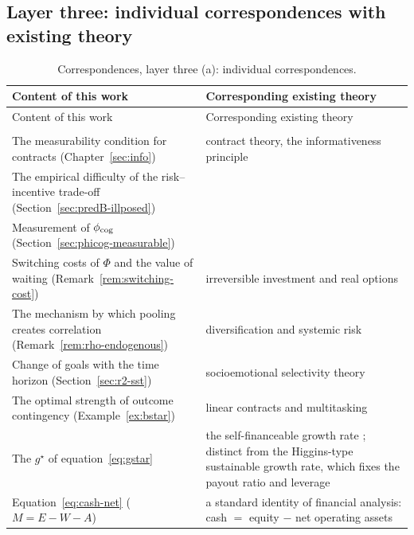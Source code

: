 \subsection*{Layer three: individual correspondences with existing theory}

\begin{longtable}{@{}>{\raggedright\arraybackslash}p{}>{\raggedright\arraybackslash}p{}@{}}
\caption{Correspondences, layer three (a): individual correspondences.}\label{tab:priorwork-layer3}\\
\toprule
Content of this work & Corresponding existing theory \\
\midrule
\endfirsthead
\toprule
Content of this work & Corresponding existing theory \\
\midrule
\endhead
\midrule
\multicolumn{2}{r}{\footnotesize (continued on the next page)}\\
\endfoot
\bottomrule
\endlastfoot
The measurability condition for contracts (Chapter~\ref{sec:info}) & contract theory, the informativeness principle \cite{holmstrom1979} \\
The empirical difficulty of the risk--incentive trade-off (Section~\ref{sec:predB-illposed}) & \cite{prendergast1999,prendergast2002} \\
Measurement of $\phi_{\rm cog}$ (Section~\ref{sec:phicog-measurable}) & \cite{dellavigna2006,einav2025} \\
Switching costs of $\Phi$ and the value of waiting (Remark~\ref{rem:switching-cost}) & irreversible investment and real options \cite{dixit1994} \\
The mechanism by which pooling creates correlation (Remark~\ref{rem:rho-endogenous}) & diversification and systemic risk \cite{wagner2010,ibragimov2011} \\
Change of goals with the time horizon (Section~\ref{sec:r2-sst}) & socioemotional selectivity theory \cite{carstensen1999} \\
The optimal strength of outcome contingency (Example~\ref{ex:bstar}) & linear contracts and multitasking \cite{holmstrom1991} \\
The $g^\star$ of equation~\eqref{eq:gstar} & the self-financeable growth rate \cite{churchill2001}; distinct from the Higgins-type sustainable growth rate, which fixes the payout ratio and leverage \\
Equation~\eqref{eq:cash-net} ($M=E-W-A$) & a standard identity of financial analysis: cash $=$ equity $-$ net operating assets \\

\end{longtable}
